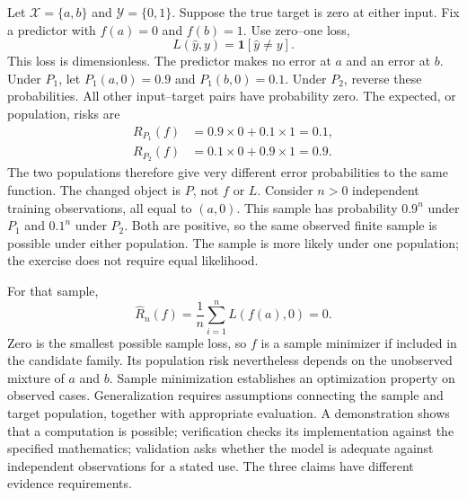 Let $\mathcal X=\{a,b\}$ and $\mathcal Y=\{0,1\}$. Suppose the true target is zero at either input. Fix a predictor with $f(a)=0$ and $f(b)=1$. Use zero--one loss,
\[
L(\hat y,y)=\mathbf1[\hat y\ne y].
\]
This loss is dimensionless. The predictor makes no error at $a$ and an error at $b$.
Under $P_1$, let $P_1(a,0)=0.9$ and $P_1(b,0)=0.1$. Under $P_2$, reverse these probabilities. All other input--target pairs have probability zero. The expected, or population, risks are
\[
\begin{aligned}
R_{P_1}(f)&=0.9\times0+0.1\times1=0.1,\\
R_{P_2}(f)&=0.1\times0+0.9\times1=0.9.
\end{aligned}
\]
The two populations therefore give very different error probabilities to the same function. The changed object is $P$, not $f$ or $L$.
Consider $n>0$ independent training observations, all equal to $(a,0)$. This sample has probability $0.9^n$ under $P_1$ and $0.1^n$ under $P_2$. Both are positive, so the same observed finite sample is possible under either population. The sample is more likely under one population; the exercise does not require equal likelihood.

For that sample,
\[
\widehat R_n(f)=\frac1n\sum_{i=1}^n L(f(a),0)=0.
\]
Zero is the smallest possible sample loss, so $f$ is a sample minimizer if included in the candidate family. Its population risk nevertheless depends on the unobserved mixture of $a$ and $b$.
Sample minimization establishes an optimization property on observed cases. Generalization requires assumptions connecting the sample and target population, together with appropriate evaluation. A demonstration shows that a computation is possible; verification checks its implementation against the specified mathematics; validation asks whether the model is adequate against independent observations for a stated use. The three claims have different evidence requirements.

